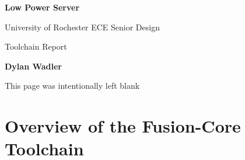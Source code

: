 \documentclass[letterpaper, 11pt, twoside]{article}
\begin{document}
\begin{titlepage}
	\begin{center}

	\vspace*{1cm}
	\Huge
	\textbf{Low Power Server}

	\vspace{0.5cm}
	\LARGE
	University of Rochester ECE Senior Design 

	\vspace{1cm}
	\LARGE
	Toolchain Report
	\vspace{1.5cm}
	
	\textbf{Dylan Wadler} 
	\vfill
	
	
	\end{center}
\end{titlepage}
\clearpage

\tableofcontents
\setcounter{page}{1}

\clearpage
\begin{center}
	This page was intentionally left blank
\end{center}

\clearpage

\section[Overview]{Overview of the Fusion-Core Toolchain}
\subsection{}
\end{document}
